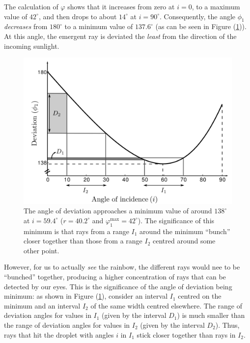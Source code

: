The calculation of $\varphi$ shows that it increases from zero at $i=0$, to a maximum value of $42^\circ$, and then drops to about $14^\circ$ at $i=90^\circ$. Consequently, the angle $\phi_1$ \textit{decreases} from $180^\circ$ to a minimum value of $137.6^\circ$ (as can be seen in Figure (\ref{fig:minDevGraph})). At this angle, the emergent ray is deviated the \textit{least} from the direction of the incoming sunlight.

\begin{figure}[!htb]
    \centering
    \includegraphics[scale=0.5]{figs/minimumDevGraph.png}
    \caption{The angle of deviation approaches a minimum value of around $138^\circ$ at $i=59.4^\circ$ ($r=40.2^\circ$ and $\varphi_1^\text{max} = 42^\circ$). The significance of this minimum is that rays from a range $I_1$ around the minimum ``bunch'' closer together than those from a range $I_2$ centred around some other point.}
    \label{fig:minDevGraph}
\end{figure}

However, for us to actually \textit{see} the rainbow, the different rays would nee to be ``bunched'' together, producing a higher concentration of rays that can be detected by our eyes. This is the significance of the angle of deviation being minimum: as shown in Figure (\ref{fig:minDevGraph}), consider an interval $I_1$ centred on the minimum and an interval $I_2$ of the same width centred elsewhere. The range of deviation angles for values in $I_1$ (given by the interval $D_1$) is much smaller than the range of deviation angles for values in $I_2$ (given by the interval $D_2$). Thus, rays that hit the droplet with angles $i$ in $I_1$ stick closer together than rays in $I_2$.

